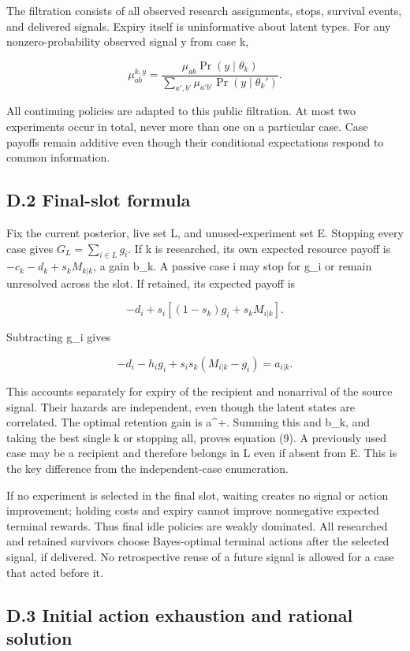\documentclass[
  11pt,
]{article}
\begin{document}
The filtration consists of all observed research assignments, stops,
survival events, and delivered signals. Expiry itself is uninformative
about latent types. For any nonzero-probability observed signal y from
case k,

\[\mu^{k,y}_{ab}=\frac{\mu_{ab}\Pr(y\mid\theta_k)}{\sum_{a',b'}\mu_{a'b'}\Pr(y\mid\theta_k')}.\]

All continuing policies are adapted to this public filtration. At most
two experiments occur in total, never more than one on a particular
case. Case payoffs remain additive even though their conditional
expectations respond to common information.

\subsection{D.2 Final-slot formula}\label{d.2-final-slot-formula}

Fix the current posterior, live set L, and unused-experiment set E.
Stopping every case gives \(G_L=\sum_{i\in L}g_i\). If k is researched,
its own expected resource payoff is \(-c_k-d_k+s_kM_{k|k}\), a gain
b\_k. A passive case i may stop for g\_i or remain unresolved across the
slot. If retained, its expected payoff is

\[-d_i+s_i[(1-s_k)g_i+s_kM_{i|k}].\]

Subtracting g\_i gives

\[-d_i-h_ig_i+s_is_k(M_{i|k}-g_i)=a_{i|k}.\]

This accounts separately for expiry of the recipient and nonarrival of
the source signal. Their hazards are independent, even though the latent
states are correlated. The optimal retention gain is a\^{}+. Summing
this and b\_k, and taking the best single k or stopping all, proves
equation (9). A previously used case may be a recipient and therefore
belongs in L even if absent from E. This is the key difference from the
independent-case enumeration.

If no experiment is selected in the final slot, waiting creates no
signal or action improvement; holding costs and expiry cannot improve
nonnegative expected terminal rewards. Thus final idle policies are
weakly dominated. All researched and retained survivors choose
Bayes-optimal terminal actions after the selected signal, if delivered.
No retrospective reuse of a future signal is allowed for a case that
acted before it.

\subsection{D.3 Initial action exhaustion and rational
solution}\label{d.3-initial-action-exhaustion-and-rational-solution}
\end{document}
